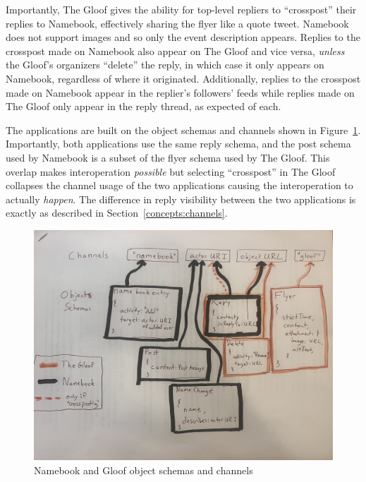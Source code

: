 Importantly, The Gloof gives the ability for
top-level repliers to ``crosspost'' their replies
to Namebook, effectively sharing the flyer like a quote tweet.
Namebook does not support images and so only the
event description appears.
Replies to the crosspost made on Namebook also appear on The Gloof
and vice versa, \emph{unless} the Gloof's organizers ``delete'' the reply,
in which case it only appears on Namebook, regardless of where it originated.
Additionally, replies to the crosspost made on Namebook appear in the replier's
followers' feeds while replies made on The Gloof only appear in the reply thread,
as expected of each.

The applications are built on the object schemas and channels
shown in Figure~\ref{case-studies:fig:schemas-and-channels}.
Importantly, both applications use the same reply schema,
and the post schema used by Namebook is a subset of the flyer
schema used by The Gloof.
This overlap makes interoperation \emph{possible}
but selecting ``crosspost'' in The Gloof collapses the
channel usage of the two applications
causing the interoperation to actually \emph{happen}.
The difference in reply visibility between the two applications
is exactly as described in Section~\ref{concepts:channels}.

\begin{figure}
    \centering
    \includegraphics[width=\columnwidth]{figures/schemas-and-channels.jpg}
    \caption{Namebook and Gloof object schemas and channels}
    \label{case-studies:fig:schemas-and-channels}
\end{figure}

